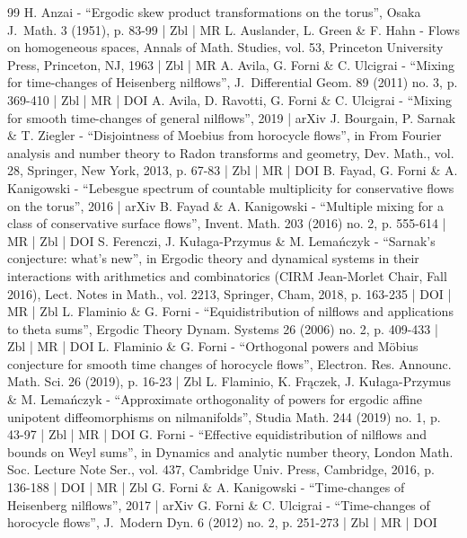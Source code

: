 \begin{thebibliography}{99}
H. Anzai - “Ergodic skew product transformations on the torus”, Osaka J. Math. 3 (1951), p. 83-99 | Zbl | MR
L. Auslander, L. Green \& F. Hahn - Flows on homogeneous spaces, Annals of Math. Studies, vol. 53, Princeton University Press, Princeton, NJ, 1963 | Zbl | MR
A. Avila, G. Forni \& C. Ulcigrai - “Mixing for time-changes of Heisenberg nilflows”, J. Differential Geom. 89 (2011) no. 3, p. 369-410 | Zbl | MR | DOI
A. Avila, D. Ravotti, G. Forni \& C. Ulcigrai - “Mixing for smooth time-changes of general nilflows”, 2019 | arXiv
J. Bourgain, P. Sarnak \& T. Ziegler - “Disjointness of Moebius from horocycle flows”, in From Fourier analysis and number theory to Radon transforms and geometry, Dev. Math., vol. 28, Springer, New York, 2013, p. 67-83 | Zbl | MR | DOI
B. Fayad, G. Forni \& A. Kanigowski - “Lebesgue spectrum of countable multiplicity for conservative flows on the torus”, 2016 | arXiv
B. Fayad \& A. Kanigowski - “Multiple mixing for a class of conservative surface flows”, Invent. Math. 203 (2016) no. 2, p. 555-614 | MR | Zbl | DOI
S. Ferenczi, J. Kułaga-Przymus \& M. Lemańczyk - “Sarnak’s conjecture: what’s new”, in Ergodic theory and dynamical systems in their interactions with arithmetics and combinatorics (CIRM Jean-Morlet Chair, Fall 2016), Lect. Notes in Math., vol. 2213, Springer, Cham, 2018, p. 163-235 | DOI | MR | Zbl
L. Flaminio \& G. Forni - “Equidistribution of nilflows and applications to theta sums”, Ergodic Theory Dynam. Systems 26 (2006) no. 2, p. 409-433 | Zbl | MR | DOI
L. Flaminio \& G. Forni - “Orthogonal powers and Möbius conjecture for smooth time changes of horocycle flows”, Electron. Res. Announc. Math. Sci. 26 (2019), p. 16-23 | Zbl
L. Flaminio, K. Frączek, J. Kułaga-Przymus \& M. Lemańczyk - “Approximate orthogonality of powers for ergodic affine unipotent diffeomorphisms on nilmanifolds”, Studia Math. 244 (2019) no. 1, p. 43-97 | Zbl | MR | DOI
G. Forni - “Effective equidistribution of nilflows and bounds on Weyl sums”, in Dynamics and analytic number theory, London Math. Soc. Lecture Note Ser., vol. 437, Cambridge Univ. Press, Cambridge, 2016, p. 136-188 | DOI | MR | Zbl
G. Forni \& A. Kanigowski - “Time-changes of Heisenberg nilflows”, 2017 | arXiv
G. Forni \& C. Ulcigrai - “Time-changes of horocycle flows”, J. Modern Dyn. 6 (2012) no. 2, p. 251-273 | Zbl | MR | DOI

\end{thebibliography}
